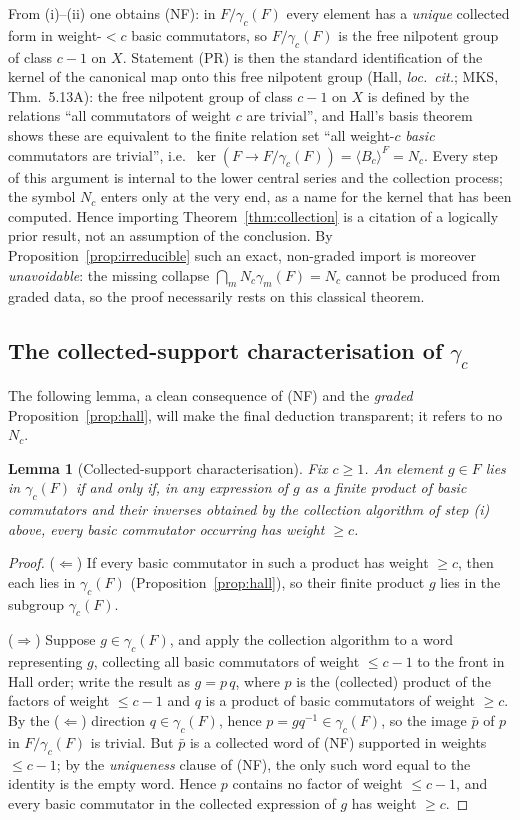 \documentclass{amsart}
\newtheorem{lemma}{Lemma}
\theoremstyle{definition}
\theoremstyle{remark}
\begin{document}
From (i)--(ii) one obtains (NF): in $F/\gamma_c(F)$ every element has a \emph{unique} collected
form in weight-$<c$ basic commutators, so $F/\gamma_c(F)$ is the free nilpotent group of class
$c-1$ on $X$. Statement (PR) is then the standard identification of the kernel of the canonical
map onto this free nilpotent group (Hall, \emph{loc.\ cit.}; MKS, Thm.~5.13A): the free
nilpotent group of class $c-1$ on $X$ is defined by the relations ``all commutators of weight
$c$ are trivial'', and Hall's basis theorem shows these are equivalent to the finite relation
set ``all weight-$c$ \emph{basic} commutators are trivial'', i.e.\ $\ker(F\to F/\gamma_c(F))=
\langle B_c\rangle^F=N_c$. Every step of this argument is internal to the lower central series
and the collection process; the symbol $N_c$ enters only at the very end, as a name for the
kernel that has been computed. Hence importing Theorem~\ref{thm:collection} is a citation of a
logically prior result, not an assumption of the conclusion. By
Proposition~\ref{prop:irreducible} such an exact, non-graded import is moreover
\emph{unavoidable}: the missing collapse $\bigcap_m N_c\gamma_m(F)=N_c$ cannot be produced from
graded data, so the proof necessarily rests on this classical theorem.

\subsection*{The collected-support characterisation of $\gamma_c$}

The following lemma, a clean consequence of (NF) and the \emph{graded}
Proposition~\ref{prop:hall}, will make the final deduction transparent; it refers to no $N_c$.

\begin{lemma}[Collected-support characterisation]\label{lem:support}
Fix $c\ge1$. An element $g\in F$ lies in $\gamma_c(F)$ if and only if, in any expression of
$g$ as a finite product of basic commutators and their inverses obtained by the collection
algorithm of step \textup{(i)} above, every basic commutator occurring has weight $\ge c$.
\end{lemma}
\begin{proof}
($\Leftarrow$) If every basic commutator in such a product has weight $\ge c$, then each lies
in $\gamma_c(F)$ (Proposition~\ref{prop:hall}), so their finite product $g$ lies in the
subgroup $\gamma_c(F)$.

($\Rightarrow$) Suppose $g\in\gamma_c(F)$, and apply the collection algorithm to a word
representing $g$, collecting all basic commutators of weight $\le c-1$ to the front in Hall
order; write the result as $g=p\,q$, where $p$ is the (collected) product of the factors of
weight $\le c-1$ and $q$ is a product of basic commutators of weight $\ge c$. By the
($\Leftarrow$) direction $q\in\gamma_c(F)$, hence $p=gq^{-1}\in\gamma_c(F)$, so the image
$\bar p$ of $p$ in $F/\gamma_c(F)$ is trivial. But $\bar p$ is a collected word of (NF) supported
in weights $\le c-1$; by the \emph{uniqueness} clause of (NF), the only such word equal to the
identity is the empty word. Hence $p$ contains no factor of weight $\le c-1$, and every basic
commutator in the collected expression of $g$ has weight $\ge c$.
\end{proof}
\end{document}
